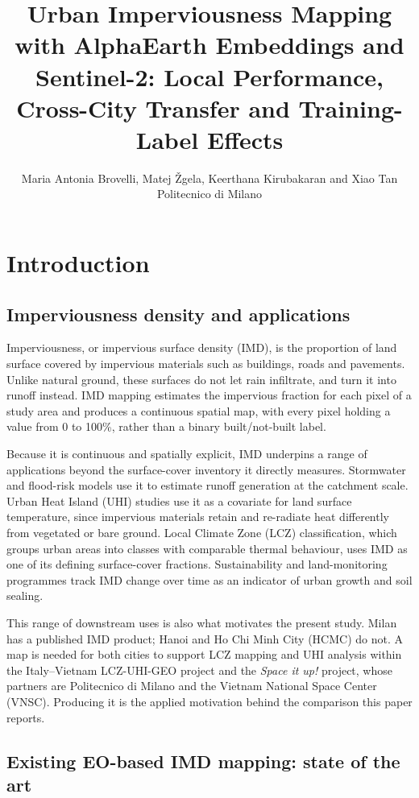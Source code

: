 \documentclass[11pt,a4paper]{article}
\title{Urban Imperviousness Mapping with AlphaEarth Embeddings and
Sentinel-2: Local Performance, Cross-City Transfer and Training-Label Effects}
\author{Maria Antonia Brovelli, Matej Žgela, Keerthana Kirubakaran and Xiao Tan\\[2pt]
\small Politecnico di Milano}
\date{}
\begin{document}
\maketitle

\section{Introduction}
\label{sec:intro}

\subsection{Imperviousness density and applications}
\label{sec:intro-imd}

Imperviousness, or impervious surface density (IMD), is the proportion of
land surface covered by impervious materials such as buildings, roads and
pavements. Unlike natural ground, these surfaces do not let rain infiltrate,
and turn it into runoff instead. IMD mapping estimates the impervious
fraction for each pixel of a study area and produces a continuous spatial
map, with every pixel holding a value from 0 to 100\%, rather than a binary
built/not-built label.

Because it is continuous and spatially explicit, IMD underpins a range of
applications beyond the surface-cover inventory it directly measures.
Stormwater and flood-risk models use it to estimate runoff generation at the
catchment scale. Urban Heat Island (UHI) studies use it as a covariate for
land surface temperature, since impervious materials retain and re-radiate
heat differently from vegetated or bare ground. Local Climate Zone (LCZ)
classification, which groups urban areas into classes with comparable
thermal behaviour, uses IMD as one of its defining surface-cover fractions.
Sustainability and land-monitoring programmes track IMD change over time as
an indicator of urban growth and soil sealing.

This range of downstream uses is also what motivates the present study. Milan
has a published IMD product; Hanoi and Ho Chi Minh City (HCMC) do not. A map
is needed for both cities to support LCZ mapping and UHI analysis within the
Italy--Vietnam LCZ-UHI-GEO project and the \emph{Space it up!} project, whose
partners are Politecnico di Milano and the Vietnam National Space Center
(VNSC). Producing it is the applied motivation behind the comparison this
paper reports.

\subsection{Existing EO-based IMD mapping: state of the art}
\label{sec:intro-sota}
\end{document}
